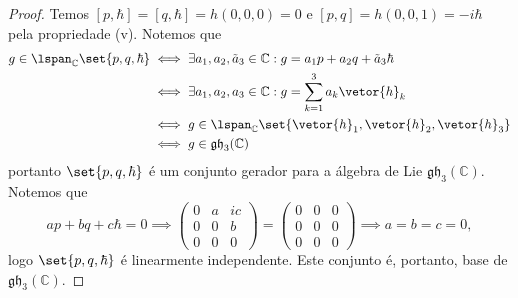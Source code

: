 \begin{proof}
    Temos \([p,\hbar] =  [q, \hbar] = h(0,0,0) = 0\) e \([p, q] = h(0,0,1) = -i \hbar\) pela propriedade (v). Notemos que
    \begin{align*}
        g \in \lspan_{\mathbb{C}}\set{p,q,\hbar} &\iff \exists a_1, a_2, \tilde{a}_3 \in \mathbb{C} : g = a_1 p + a_2 q + \tilde{a}_3 \hbar\\
                                                 &\iff \exists a_1,a_2,a_3 \in \mathbb{C}: g = \sum_{k=1}^3 a_k\vetor{h}_k\\
                                                 &\iff g \in \lspan_{\mathbb{C}}\set{\vetor{h}_1, \vetor{h}_2, \vetor{h}_3}\\
                                                 &\iff g \in \mathfrak{gh}_3(\mathbb{C})
    \end{align*}
    portanto \(\set{p,q,\hbar}\) é um conjunto gerador para a álgebra de Lie \(\mathfrak{gh}_3(\mathbb{C})\). Notemos que
    \begin{equation*}
        a p + b q + c \hbar = 0 \implies \begin{pmatrix}
            0 & a & ic\\
            0 & 0 & b\\
            0 & 0 & 0
        \end{pmatrix} = \begin{pmatrix}
            0 & 0 & 0\\
            0 & 0 & 0\\
            0 & 0 & 0
        \end{pmatrix} \implies a = b = c = 0,
    \end{equation*}
    logo \(\set{p,q,\hbar}\) é linearmente independente. Este conjunto é, portanto, base de \(\mathfrak{gh}_3(\mathbb{C})\).
\end{proof}

